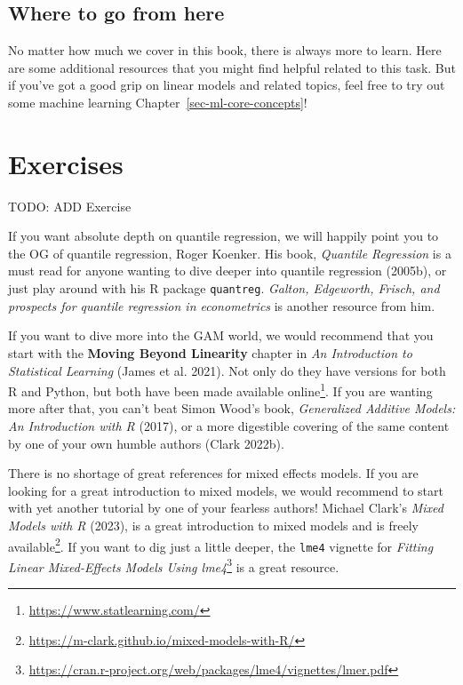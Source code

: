 \documentclass[
  letterpaper,
]{krantz}
\DeclareRobustCommand{\href}[2]{#2\footnote{\url{#1}}}
\begin{document}
\subsection{Where to go from here}\label{sec-lm-extend-w2g}

No matter how much we cover in this book, there is always more to learn.
Here are some additional resources that you might find helpful related
to this task. But if you've got a good grip on linear models and related
topics, feel free to try out some machine learning
Chapter~\ref{sec-ml-core-concepts}!

\section{Exercises}\label{sec-lm-extend-exercise}

TODO: ADD Exercise

If you want absolute depth on quantile regression, we will happily point
you to the OG of quantile regression, Roger Koenker. His book,
\emph{Quantile Regression} is a must read for anyone wanting to dive
deeper into quantile regression (2005b), or just play around with his R
package \texttt{quantreg}. \emph{Galton, Edgeworth, Frisch, and
prospects for quantile regression in econometrics} is another resource
from him.

If you want to dive more into the GAM world, we would recommend that you
start with the \textbf{Moving Beyond Linearity} chapter in \emph{An
Introduction to Statistical Learning} (James et al. 2021). Not only do
they have versions for both R and Python, but both have been made
\href{https://www.statlearning.com/}{available online}. If you are
wanting more after that, you can't beat Simon Wood's book,
\emph{Generalized Additive Models: An Introduction with R} (2017), or a
more digestible covering of the same content by one of your own humble
authors (Clark 2022b).

There is no shortage of great references for mixed effects models. If
you are looking for a great introduction to mixed models, we would
recommend to start with yet another tutorial by one of your fearless
authors! Michael Clark's \emph{Mixed Models with R} (2023), is a great
introduction to mixed models and is
\href{https://m-clark.github.io/mixed-models-with-R/}{freely available}.
If you want to dig just a little deeper, the \texttt{lme4} vignette for
\href{https://cran.r-project.org/web/packages/lme4/vignettes/lmer.pdf}{\emph{Fitting
Linear Mixed-Effects Models Using lme4}} is a great resource.
\end{document}

